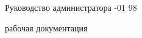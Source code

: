 \documentclass[12pt,cmcyralt]{article}
\begin{document}
\begin{titlepage}
    \vspace{1.2em}                                                        
                                                                                        
    \begin{center}                                                        
    \Large Руководство администратора -01 98                                                                  
    \end{center}                                                          
                                                                                        
    \vspace{5em}                                                          
                                                                                        
    \begin{center}                                                        
     рабочая документация                                                           
     \end{center}                                                         
    \vspace{6em}                                                          
                                                                                        
                                                                                        

\end{titlepage}
\end{document}
